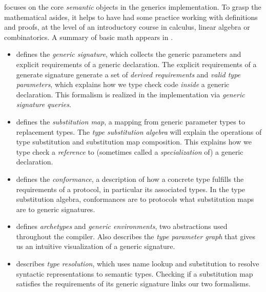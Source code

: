 \documentclass[../generics]{subfiles}
\begin{document}
 focuses on the core \emph{semantic} objects in the generics implementation. To grasp the mathematical asides, it helps to have had some practice working with definitions and proofs, at the level of an introductory course in calculus, linear algebra or combinatorics. A summary of basic math appears in .
\begin{itemize}
\item {} defines the \emph{generic signature}, which collects the generic parameters and explicit requirements of a generic declaration. The explicit requirements of a generate signature generate a set of \emph{derived requirements} and \emph{valid type parameters}, which explains how we type check code \emph{inside} a generic declaration. This formalism is realized in the implementation via \emph{generic signature queries}.

\item {} defines the \emph{substitution map}, a mapping from generic parameter types to replacement types. The \emph{type substitution algebra} will explain the operations of type substitution and substitution map composition. This explains how we type check a \emph{reference} to (sometimes called a \emph{specialization} of) a generic declaration.

\item {} defines the \emph{conformance}, a description of how a concrete type fulfills the requirements of a protocol, in particular its associated types. In the type substitution algebra, conformances are to protocols what substitution maps are to generic signatures.

\item {} defines \emph{archetypes} and \emph{generic environments}, two abstractions used throughout the compiler. Also describes the \emph{type parameter graph} that gives us an intuitive visualization of a generic signature.

\item {} describes \emph{type resolution}, which uses name lookup and substitution to resolve syntactic representations to semantic types. Checking if a substitution map satisfies the requirements of its generic signature links our two formalisms.
\end{itemize}
\end{document}
